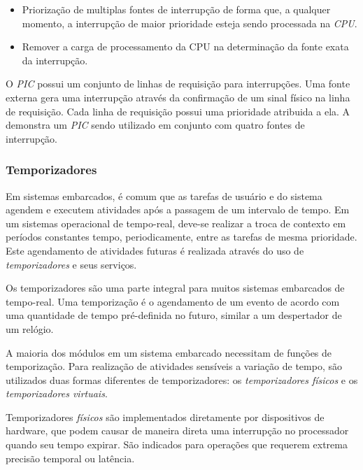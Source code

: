 \begin{itemize}
	\item Priorização de multiplas fontes de interrupção de forma que, a qualquer momento, a interrupção de maior prioridade esteja sendo processada na \emph{CPU}.
	\item Remover a carga de processamento da CPU na determinação da fonte exata da interrupção.
\end{itemize}

O \emph{PIC} possui um conjunto de linhas de requisição para interrupções. Uma fonte externa gera uma interrupção através da confirmação de um sinal físico na linha de requisição. Cada linha de requisição possui uma prioridade atribuida a ela. A  demonstra um \emph{PIC} sendo utilizado em conjunto com quatro fontes de interrupção.


\subsubsection{Temporizadores}

Em sistemas embarcados, é comum que as tarefas de usuário e do sistema agendem e executem atividades após a passagem de um intervalo de tempo. Em um sistemas operacional de tempo-real, deve-se realizar a troca de contexto em períodos constantes tempo, periodicamente, entre as tarefas de mesma prioridade. Este agendamento de atividades futuras é realizada através do uso de \emph{temporizadores} e seus serviços.

Os temporizadores são uma parte integral para muitos sistemas embarcados de tempo-real. Uma temporização é o agendamento de um evento de acordo com uma quantidade de tempo pré-definida no futuro, similar a um despertador de um relógio.

A maioria dos módulos em um sistema embarcado necessitam de funções de temporização. Para realização de atividades sensíveis a variação de tempo, são utilizados duas formas diferentes de temporizadores: os \emph{temporizadores físicos} e os \emph{temporizadores virtuais}.

Temporizadores \emph{físicos} são implementados diretamente por dispositivos de hardware, que podem causar de maneira direta uma interrupção no processador quando seu tempo expirar. São indicados para operações que requerem extrema precisão temporal ou latência.

